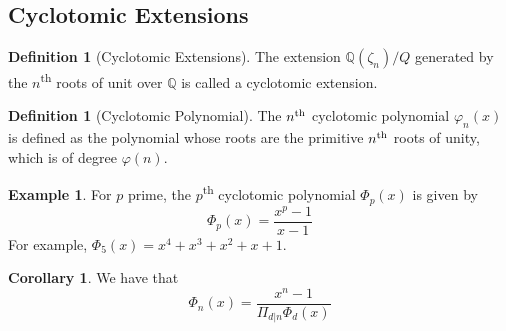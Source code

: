 \documentclass[10pt, oneside, reqno]{amsart}
\theoremstyle{plain}%
\theoremstyle{definition}
\newtheorem{defn}[thm]{Definition}
\newtheorem{exmp}[thm]{Example}
\newtheorem{cor}[thm]{Corollary}
\theoremstyle{remark}
\newcommand{\Q}{\mathbb{Q}}
\newcommand{\nth}{n\textsuperscript{th}}
\begin{document}


\subsection{Cyclotomic Extensions} %
\label{sub:cyclotomic_extensions}
\begin{defn}[Cyclotomic Extensions]
	The extension $\Q(\zeta_n)/Q$ generated by the $n$\textsuperscript{th} roots of unit over $\Q$ is called a cyclotomic extension.
\end{defn}

\begin{defn}[Cyclotomic Polynomial]
	The $\nth$ cyclotomic polynomial $\varphi_n(x)$ is defined as the polynomial whose roots are the primitive $\nth$ roots of unity, which is of degree $\varphi(n)$.  
\end{defn}
\begin{exmp}
	For $p$ prime, the $p$\textsuperscript{th} cyclotomic polynomial $\Phi_p(x)$ is given by \[
		\Phi_p(x) = \frac{x^p - 1}{x-1}
	\] 
	For example, $\Phi_5(x) = x^4 + x^3 + x^2 + x + 1$.
\end{exmp}
\begin{cor}
	We have that \[
		\Phi_n(x) = \frac{x^n - 1}{\Pi_{d|n} \Phi_d(x)}
	\]
\end{cor}
\end{document}
